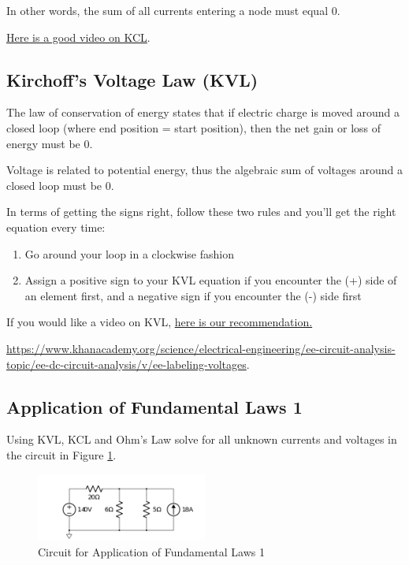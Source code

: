 \documentclass{article}
\begin{document}
In other words, the sum of all currents entering a node must equal 0.

\href{https://www.khanacademy.org/science/electrical-engineering/ee-circuit-analysis-topic/ee-dc-circuit-analysis/v/ee-kirchhoffs-current-law}{Here is a good video on KCL}.

\subsection{Kirchoff's Voltage Law (KVL)}

The law of conservation of energy states that if electric charge is moved around a closed loop (where end position = start position), then the net gain or loss of energy must be 0.

Voltage is related to potential energy, thus the algebraic sum of voltages around a closed loop must be 0.

In terms of getting the signs right, follow these two rules and you'll get the right equation every time:

\begin{enumerate}
  \item Go around your loop in a clockwise fashion
  \item Assign a positive sign to your KVL equation if you encounter the (+) side of an element first, and a negative sign if you encounter the (-) side first
\end{enumerate}

If you would like a video on KVL, \href{https://www.khanacademy.org/science/electrical-engineering/ee-circuit-analysis-topic/ee-dc-circuit-analysis/v/ee-kirchhoffs-voltage-law}{here is our recommendation.}

\href{Here is a video showing an example of how we label
voltages}{https://www.khanacademy.org/science/electrical-engineering/ee-circuit-analysis-topic/ee-dc-circuit-analysis/v/ee-labeling-voltages}.

\subsection{Application of Fundamental Laws 1}

Using KVL, KCL and Ohm's Law solve for all unknown currents and voltages in the
circuit in Figure \ref{fig:assignment1}.

\begin{figure}[!htbp]
\centering
\includegraphics[width=0.5\textwidth]{khan_task}
\caption{Circuit for Application of Fundamental Laws 1}
\label{fig:assignment1}
\end{figure}
\end{document}
